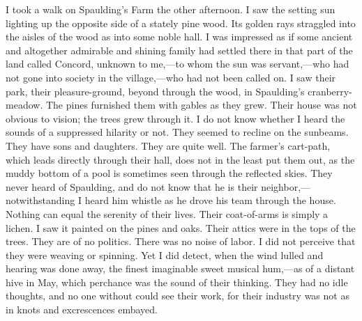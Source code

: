 \documentclass[twoside,openright,10pt]{memoir} %
\begin{document}
I took a walk on Spaulding’s Farm the other afternoon. I saw the setting sun lighting up the opposite side of a stately pine wood. Its golden rays straggled into the aisles of the wood as into some noble hall. I was impressed as if some ancient and altogether admirable and shining family had settled there in that part of the land called Concord, unknown to me,—to whom the sun was servant,—who had not gone into society in the village,—who had not been called on. I saw their park, their pleasure-ground, beyond through the wood, in Spaulding’s cranberry-meadow. The pines furnished them with gables as they grew. Their house was not obvious to vision; the trees grew through it. I do not know whether I heard the sounds of a suppressed hilarity or not. They seemed to recline on the sunbeams. They have sons and daughters. They are quite well. The farmer’s cart-path, which leads directly through their hall, does not in the least put them out, as the muddy bottom of a pool is sometimes seen through the reflected skies. They never heard of Spaulding, and do not know that he is their neighbor,—notwithstanding I heard him whistle as he drove his team through the house. Nothing can equal the serenity of their lives. Their coat-of-arms is simply a lichen. I saw it painted on the pines and oaks. Their attics were in the tops of the trees. They are of no politics. There was no noise of labor. I did not perceive that they were weaving or spinning. Yet I did detect, when the wind lulled and hearing was done away, the finest imaginable sweet musical hum,—as of a distant hive in May, which perchance was the sound of their thinking. They had no idle thoughts, and no one without could see their work, for their industry was not as in knots and excrescences embayed.
\end{document}
